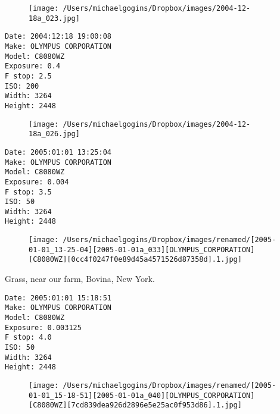 \documentclass[11pt,letter,DIV=14,paper=landscape]{scrbook}
\begin{document}
\begin{figure}
\texttt{[image: /Users/michaelgogins/Dropbox/images/2004-12-18a\_023.jpg]}
\end{figure}
    
\clearpage
\noindent 
\noindent
\begin{lstlisting}
Date: 2004:12:18 19:00:08
Make: OLYMPUS CORPORATION
Model: C8080WZ
Exposure: 0.4
F stop: 2.5
ISO: 200
Width: 3264
Height: 2448
\end{lstlisting}
\clearpage

\begin{figure}
\texttt{[image: /Users/michaelgogins/Dropbox/images/2004-12-18a\_026.jpg]}
\end{figure}
    
\clearpage
\noindent 
\noindent
\begin{lstlisting}
Date: 2005:01:01 13:25:04
Make: OLYMPUS CORPORATION
Model: C8080WZ
Exposure: 0.004
F stop: 3.5
ISO: 50
Width: 3264
Height: 2448
\end{lstlisting}
\clearpage

\begin{figure}
\texttt{[image: /Users/michaelgogins/Dropbox/images/renamed/[2005-01-01\_13-25-04][2005-01-01a\_033][OLYMPUS\_CORPORATION][C8080WZ][0cc4f0247f0e89d45a4571526d87358d].1.jpg]}
\end{figure}
    
\clearpage
\noindent Grass, near our farm, Bovina, New York.
\noindent
\begin{lstlisting}
Date: 2005:01:01 15:18:51
Make: OLYMPUS CORPORATION
Model: C8080WZ
Exposure: 0.003125
F stop: 4.0
ISO: 50
Width: 3264
Height: 2448
\end{lstlisting}
\clearpage

\begin{figure}
\texttt{[image: /Users/michaelgogins/Dropbox/images/renamed/[2005-01-01\_15-18-51][2005-01-01a\_040][OLYMPUS\_CORPORATION][C8080WZ][7cd839dea926d2896e5e25ac0f953d86].1.jpg]}
\end{figure}
    
\end{document}
